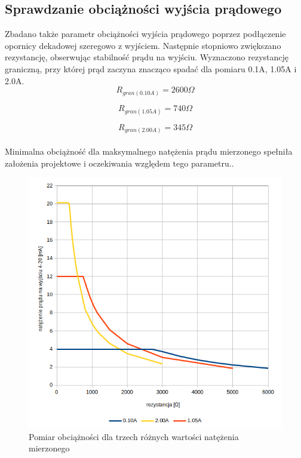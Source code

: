 \documentclass[12pt]{article}
\begin{document}
\subsection{Sprawdzanie obciążności wyjścia prądowego}
Zbadano także parametr obciążności wyjścia prądowego poprzez podłączenie opornicy dekadowej szeregowo z wyjściem. Następnie stopniowo zwiększano rezystancję, obserwując stabilność prądu na wyjściu. Wyznaczono rezystancję graniczną, przy której prąd zaczyna znacząco spadać dla pomiaru 0.1A, 1.05A i 2.0A.
\begin{equation*}
R_{gran(0.10A)} = 2600\Omega
\end{equation*}

\begin{equation*}
R_{gran(1.05A)} = 740\Omega
\end{equation*}

\begin{equation*}
R_{gran(2.00A)} = 345\Omega
\end{equation*} \\

\noindent Minimalna obciążność dla maksymalnego natężenia prądu mierzonego spełniła założenia projektowe i oczekiwania względem tego parametru..

\begin{figure}
	\centering
	\includegraphics[scale=1]{r_graph.png}
	\caption{Pomiar obciążności dla trzech różnych wartości natężenia mierzonego}
\end{figure}
\end{document}
